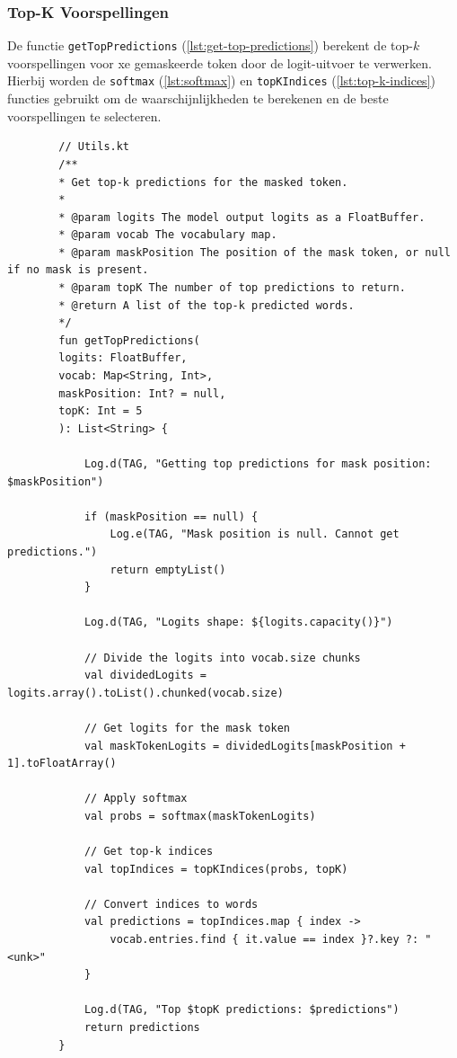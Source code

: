 \subsubsection{Top-K Voorspellingen}

De functie \texttt{getTopPredictions} (\ref{lst:get-top-predictions}) berekent de top-\(k\) voorspellingen voor xe gemaskeerde token door de logit-uitvoer te verwerken. Hierbij worden de \texttt{softmax} (\ref{lst:softmax}) en \texttt{topKIndices} (\ref{lst:top-k-indices}) functies gebruikt om de waarschijnlijkheden te berekenen en de beste voorspellingen te selecteren.

\begin{listing}
    \begin{verbatim}
        // Utils.kt
        /**
        * Get top-k predictions for the masked token.
        *
        * @param logits The model output logits as a FloatBuffer.
        * @param vocab The vocabulary map.
        * @param maskPosition The position of the mask token, or null if no mask is present.
        * @param topK The number of top predictions to return.
        * @return A list of the top-k predicted words.
        */
        fun getTopPredictions(
        logits: FloatBuffer,
        vocab: Map<String, Int>,
        maskPosition: Int? = null,
        topK: Int = 5
        ): List<String> {
            
            Log.d(TAG, "Getting top predictions for mask position: $maskPosition")
            
            if (maskPosition == null) {
                Log.e(TAG, "Mask position is null. Cannot get predictions.")
                return emptyList()
            }
            
            Log.d(TAG, "Logits shape: ${logits.capacity()}")
            
            // Divide the logits into vocab.size chunks
            val dividedLogits = logits.array().toList().chunked(vocab.size)
            
            // Get logits for the mask token
            val maskTokenLogits = dividedLogits[maskPosition + 1].toFloatArray()
            
            // Apply softmax
            val probs = softmax(maskTokenLogits)
           
            // Get top-k indices
            val topIndices = topKIndices(probs, topK)
            
            // Convert indices to words
            val predictions = topIndices.map { index ->
                vocab.entries.find { it.value == index }?.key ?: "<unk>"
            }
            
            Log.d(TAG, "Top $topK predictions: $predictions")
            return predictions
        }
        \end{verbatim}
    \caption[\texttt{getTopPredictions}]{De \texttt{getTopPredictions} functie berekent de top-\(k\) voorspellingen voor de gemaskeerde token door de \gls{logit}-uitvoer te verwerken en \gls{softmax} toe te passen om de waarschijnlijkheden te berekenen.}
    \label{lst:get-top-predictions}
\end{listing}

